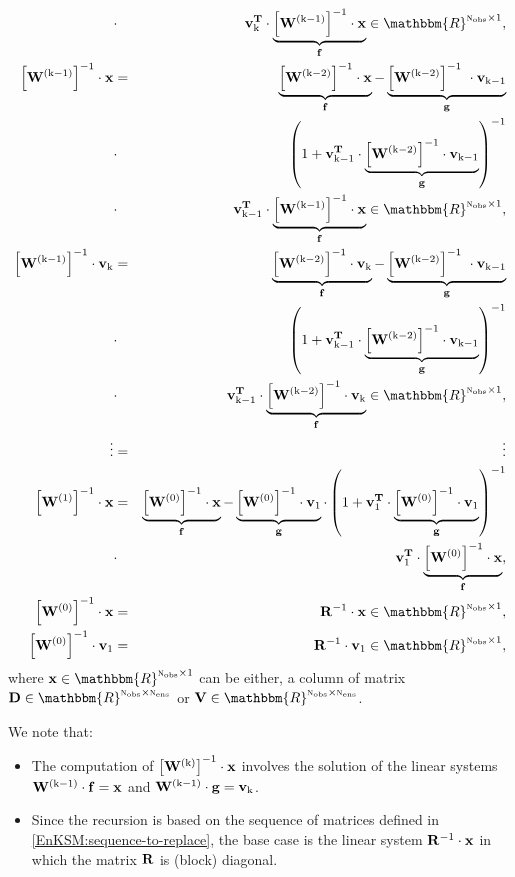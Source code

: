 \documentclass[12pt]{article}
\newcommand{\inv}[1]{\left[{\bf W^{(\rm #1)}}\right]^{\rm -1}}
\newcommand{\Nobs}{\textsc{n}_{{\rm obs}}}
\newcommand{\Nens}{\textsc{n}_{{\rm ens}}}
\newcommand{\R}{{\bf R}}
\newcommand{\D}{{\bf D}}
\newcommand{\W}[1]{{{\bf W}^{\left ( {\rm #1} \right )}}}
\newcommand{\V}{{\bf V}}
\renewcommand{\v}[1]{{\bf v}_{{\rm #1}}}
\renewcommand{\Re}{\mathbbm{R}}
\newcommand{\invM}[1]{\left( #1 \right )^{-1}}
\newcommand{\invS}[1]{ {#1^{-1}}}
\newcommand{\x}{{\bf x}}
\begin{document}
{\begin{eqnarray}
&\cdot & \v{k}^{\bf T} \cdot \underbrace{\inv{k-1} \cdot \x}_{\bf f} \in \Re^{\Nobs \times 1}, \\ \nonumber
\inv{k-1} \cdot \x &=& \underbrace{\inv{k-2} \cdot \x}_{\bf f}-\underbrace{\inv{k-2}\ \cdot \v{k-1}}_{\bf g} \\ \nonumber
&\cdot & \invM{1+\v{k-1}^{\bf T} \cdot \underbrace{\inv{k-2} \cdot \v{k-1}}_{\bf g}} \\ \nonumber
&\cdot & \v{k-1}^{\bf T} \cdot \underbrace{\inv{k-1} \cdot \x}_{\bf f} \in \Re^{\Nobs \times 1}, \\ \nonumber
\inv{k-1} \cdot \v{k} &=& \underbrace{\inv{k-2} \cdot \v{k}}_{\bf f}-\underbrace{\inv{k-2}\ \cdot \v{k-1}}_{\bf g} \\ \nonumber
&\cdot & \invM{1+\v{k-1}^{\bf T} \cdot \underbrace{\inv{k-2} \cdot \v{k-1}}_{\bf g}} \\ \nonumber
&\cdot & \v{k-1}^{\bf T} \cdot \underbrace{\inv{k-2} \cdot \v{k}}_{\bf f} \in \Re^{\Nobs \times 1}, \\ \nonumber
\vdots & =& \vdots \\ \nonumber
\inv{1} \cdot \x &=& \underbrace{\inv{0} \cdot \x}_{\bf f}-\underbrace{\inv{0} \cdot \v{1}}_{\bf g} \cdot  \invM{1+\v{1}^{\bf T} \cdot \underbrace{\inv{0} \cdot \v{1}}_{\bf g}} \\ \nonumber
&\cdot & \v{1}^{\bf T} \cdot \underbrace{\inv{0} \cdot \x}_{\bf f}, \\ \nonumber
\inv{0} \cdot \x &=& \invS{\R} \cdot \x \in \Re^{\Nobs \times 1}, \\ \nonumber
\inv{0} \cdot \v{1} &=& \invS{\R} \cdot \v{1} \in \Re^{\Nobs \times 1},
\end{eqnarray}
}
where $\x \in \Re^{\Nobs \times 1}$ can be either, a column of matrix $\D \in \Re^{\Nobs \times \Nens}$ or $\V \in \Re^{\Nobs \times \Nens}$. 

We note that:
\begin{itemize}
\item The computation of $\inv{k} \cdot \x$ involves the solution of the linear systems $\W{k-1} \cdot {\bf f} = \x$ and $\W{k-1} \cdot {\bf g} = \v{k}$.
\item Since the recursion is based on the sequence of matrices defined in \eqref{EnKSM:sequence-to-replace}, the base case is the linear system $\invS{\R} \cdot \x$ in which the matrix $\R$ is (block) diagonal.
\end{itemize}
\end{document}

